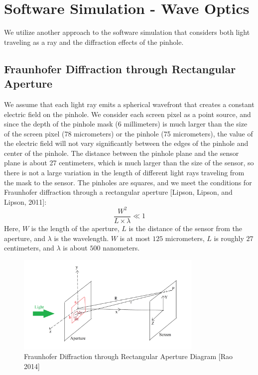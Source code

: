 \documentclass{acmsiggraph}
\begin{document}
\section{Software Simulation - Wave Optics}

We utilize another approach to the software simulation that considers both light traveling as a ray and the diffraction effects of the pinhole. 

\subsection{Fraunhofer Diffraction through Rectangular Aperture}
\noindent We assume that each light ray emits a spherical wavefront that creates a constant electric field on the pinhole. We consider each screen pixel as a point source, and since the depth of the pinhole mask (6 millimeters) is much larger than the size of the screen pixel (78 micrometers) or the pinhole (75 micrometers), the value of the electric field will not vary significantly between the edges of the pinhole and center of the pinhole. The distance between the pinhole plane and the sensor plane is about 27 centimeters, which is much larger than the size of the sensor, so there is not a large variation in the length of different light rays traveling from the mask to the sensor. The pinholes are squares, and we meet the conditions for Fraunhofer diffraction through a rectangular aperture [Lipson, Lipson, and Lipson, 2011]: 
$$\frac{W^2}{L \times \lambda} \ll 1$$
Here, $W$ is the length of the aperture, $L$ is the distance of the sensor from the aperture, and $\lambda$ is the wavelength. $W$ is at most $125$ micrometers, $L$ is roughly $27$ centimeters, and $\lambda$ is about $500$ nanometers. 

\begin{figure}[ht]
  \centering
  \includegraphics[width=3.5in]{Rectangular_Aperture.png}
  \caption{Fraunhofer Diffraction through Rectangular Aperture Diagram [Rao 2014]}
  \label{fig:ferrari}
\end{figure}
\end{document}
